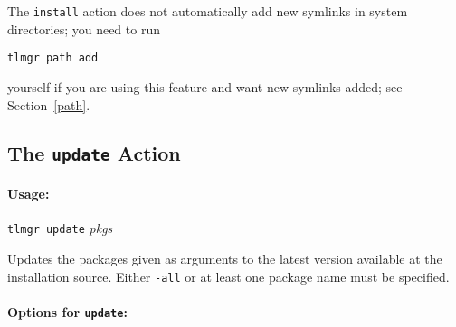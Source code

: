 \documentclass[11pt]{article}
\begin{document}
\par\noindent 
The \texttt{install} action does not
automatically add new symlinks in system directories; you
need to run
\begin{center}
  \texttt{tlmgr path add} 
\end{center}
yourself if you are using this feature and want new symlinks
added; see Section~\ref{path}.

\clearpage

\subsection{The {\tt update} Action}
\label{update}

\paragraph{Usage:}

\begin{list}{}{}
\item \texttt{tlmgr update} \textsl{pkgs} 
\end{list}
Updates the packages given as arguments to the latest
version available at the installation source. Either
\texttt{-all} or at least one package name must be
specified.

\paragraph{Options for {\tt update}:}
\end{document}
